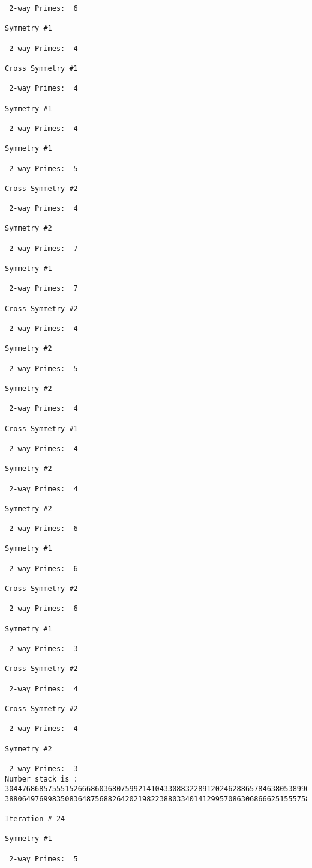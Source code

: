 \begin{verbatim}
 2-way Primes: 	6

Symmetry #1

 2-way Primes: 	4

Cross Symmetry #1

 2-way Primes: 	4

Symmetry #1

 2-way Primes: 	4

Symmetry #1

 2-way Primes: 	5

Cross Symmetry #2

 2-way Primes: 	4

Symmetry #2

 2-way Primes: 	7

Symmetry #1

 2-way Primes: 	7

Cross Symmetry #2

 2-way Primes: 	4

Symmetry #2

 2-way Primes: 	5

Symmetry #2

 2-way Primes: 	4

Cross Symmetry #1

 2-way Primes: 	4

Symmetry #2

 2-way Primes: 	4

Symmetry #2

 2-way Primes: 	6

Symmetry #1

 2-way Primes: 	6

Cross Symmetry #2

 2-way Primes: 	6

Symmetry #1

 2-way Primes: 	3

Cross Symmetry #2

 2-way Primes: 	4

Cross Symmetry #2

 2-way Primes: 	4

Symmetry #2

 2-way Primes: 	3
Number stack is :
30447686857555152666860368075992141043308832289120246288657846380538996794608835958544046240163340857
38806497699835083648756882642021982238803340141299570863068666251555758686744037580433610426404458595

Iteration #	24

Symmetry #1

 2-way Primes: 	5


\end{verbatim}
